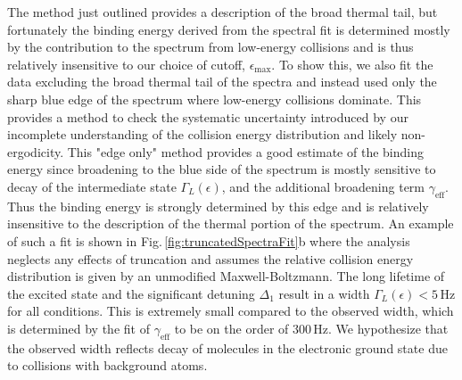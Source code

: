 The method just outlined provides a description of the broad thermal tail, but fortunately the binding energy derived from the spectral fit is determined mostly by the contribution to the spectrum from low-energy collisions and is thus relatively insensitive to our choice of cutoff, $\epsilon_{\text{max}}$. 
To show this, we also fit the data excluding the broad thermal tail of the spectra and instead used only the sharp blue edge of the spectrum where low-energy collisions dominate.
This provides a method to check the systematic uncertainty introduced by our incomplete understanding of the collision energy distribution and likely non-ergodicity. 
This "edge only" method provides a good estimate of the binding energy since broadening to the blue side of the spectrum is mostly sensitive to decay of the intermediate state $\Gamma_L(\epsilon)$, and the additional broadening term $\gamma_{\text{eff}}$.
Thus the binding energy is strongly determined by this edge and is relatively insensitive to the description of the thermal portion of the spectrum.
An example of such a fit is shown in Fig.\,\ref{fig:truncatedSpectraFit}b where the analysis neglects any effects of truncation and assumes the relative collision energy distribution is given by an unmodified Maxwell-Boltzmann.
The long lifetime of the excited state and the significant detuning $\Delta_1$ result in a width $\Gamma_L(\epsilon) < 5\,\text{Hz}$ for all conditions.
This is extremely small compared to the observed width, which is determined by the fit of $\gamma_{\text{eff}}$ to be on the order of $300\,\text{Hz}$.
We hypothesize that the observed width reflects decay of molecules in the electronic ground state due to collisions with background atoms.

